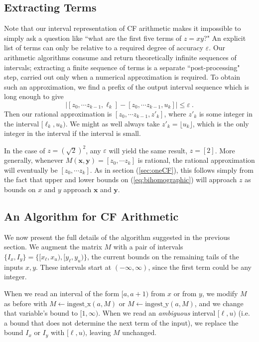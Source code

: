 \documentclass[11pt, oneside]{amsart}   	%
\renewcommand{\:}{\negthickspace:\negthickspace}
\begin{document}
\subsection{Extracting Terms}
Note that our interval representation of CF arithmetic makes it impossible to simply ask a question like ``what are the first
five terms of $z = xy$?" An explicit list of terms can only be relative to a required degree of accuracy $\varepsilon$. Our arithmetic
algorithms consume and return theoretically infinite sequences of intervals; extracting a finite sequence of terms is a separate
``post-processing" step, carried out only when a numerical approximation is required.
To obtain such an approximation, we find a prefix of
the output interval sequence which is long enough to give
\[
 \bigl| [z_0, \cdots z_{k-1}, \ell_k] - [z_0, \cdots z_{k-1}, u_k] \bigr| \leq \varepsilon \ .
\]
Then our rational approximation is $[z_0, \cdots z_{k-1}, z'_k]$, where $z'_k$ is some integer in the interval
$[\ell_k,u_k)$. We might as well always take $z'_k = \lfloor u_k \rfloor$, which is the only integer in the interval if the interval is small. 

In the case of $z=(\sqrt{2})^2$, any $\varepsilon$ will yield the same result, $z = [2]$. More generally, whenever $M(\mathbf{x},\mathbf{y}) = [z_0, \cdots z_k]$ is rational, the rational approximation will eventually be $[z_0, \cdots z_k]$. As in section (\ref{sec:oneCF}), this follows simply from the fact that upper and lower bounds on (\ref{eq:bihomographic}) will approach $z$ as bounds on $x$ and $y$ approach $\mathbf{x}$ and $\mathbf{y}$.

\subsection{An Algorithm for CF Arithmetic}\label{sec:finalAlgorithm}
We now present the full details of the algorithm suggested in the previous section.  We augment the matrix $M$ with a pair of intervals
$\{I_x, I_y\} = \{[x_{\ell},x_{u}), [y_{\ell}, y_{u})\}$, the current bounds on the remaining tails of the inputs $x,y$. These
intervals start at $(-\infty, \infty)$, since the first term could be any integer.

When we read an interval of the form $[a,a+1)$ from
$x$ or from $y$, we modify $M$ as before with $M \leftarrow \mbox{ingest\_x}(a,M)$ or $M \leftarrow \mbox{ingest\_y}(a,M)$,
and we change that variable's bound to $[1, \infty)$. When we read an \emph{ambiguous} interval $[\ell, u)$ (i.e. a bound that
does not determine the next term of the input), we replace the bound $I_x$ or $I_y$  with $[\ell, u)$, leaving $M$ unchanged.
\end{document}
